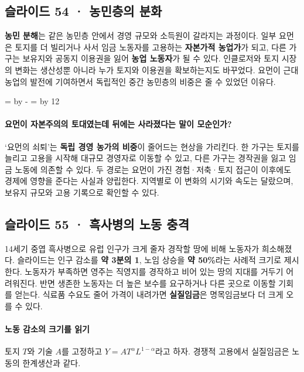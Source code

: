 \documentclass[10pt,a4paper]{article}
\newcommand{\ReserveQuestionSpace}{%
  \par\begingroup
  \dimen0=\pagegoal \advance\dimen0 by -\pagetotal
  \dimen2=\baselineskip \multiply\dimen2 by 12
  \ifdim\dimen0<\dimen2 \newpage\fi
  \endgroup}
\begin{document}
\subsection{슬라이드 54 · 농민층의 분화}
\textbf{농민 분해}는 같은 농민층 안에서 경영 규모와 소득원이 갈라지는 과정이다. 일부 요먼은 토지를 더 빌리거나 사서 임금 노동자를 고용하는 \textbf{자본가적 농업가}가 되고, 다른 가구는 보유지와 공동지 이용권을 잃어 \textbf{농업 노동자}가 될 수 있다. 인클로저와 토지 시장의 변화는 생산성뿐 아니라 누가 토지와 이용권을 확보하는지도 바꾸었다. 요먼이 근대 농업의 발전에 기여하면서 독립적인 중간 농민층의 비중은 줄 수 있었던 이유다.\par

\ReserveQuestionSpace
\paragraph{요먼이 자본주의의 토대였는데 뒤에는 사라졌다는 말이 모순인가?}
‘요먼의 쇠퇴’는 \textbf{독립 경영 농가의 비중}이 줄어드는 현상을 가리킨다. 한 가구는 토지를 늘리고 고용을 시작해 대규모 경영자로 이동할 수 있고, 다른 가구는 경작권을 잃고 임금 노동에 의존할 수 있다. 두 경로는 요먼이 가진 경험·저축·토지 접근이 이후에도 경제에 영향을 준다는 사실과 양립한다. 지역별로 이 변화의 시기와 속도는 달랐으며, 보유지 규모와 고용 기록으로 확인할 수 있다.\par

\subsection{슬라이드 55 · 흑사병의 노동 충격}
14세기 중엽 흑사병으로 유럽 인구가 크게 줄자 경작할 땅에 비해 노동자가 희소해졌다. 슬라이드는 인구 감소를 \textbf{약 3분의 1}, 노임 상승을 \textbf{약 50\%}라는 사례적 크기로 제시한다. 노동자가 부족하면 영주는 직영지를 경작하고 비어 있는 땅의 지대를 거두기 어려워진다. 반면 생존한 노동자는 더 높은 보수를 요구하거나 다른 곳으로 이동할 기회를 얻는다. 식료품 수요도 줄어 가격이 내려가면 \textbf{실질임금}은 명목임금보다 더 크게 오를 수 있다.\par

\paragraph{노동 감소의 크기를 읽기}

토지 $T$와 기술 $A$를 고정하고 $Y=A T^\alpha L^{1-\alpha}$라고 하자. 경쟁적 고용에서 실질임금은 노동의 한계생산과 같다.\par
\end{document}
